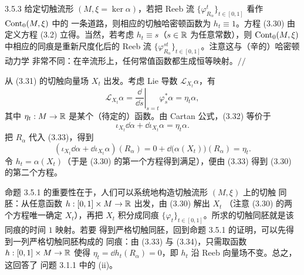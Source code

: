 \begin{wexam}{3.5.3}
给定切触流形 $(M,\xi=\ker\alpha)$，若把 Reeb 流
$\{\varphi^t_{R_\alpha}\}_{t\in[0,1]}$ 看作 $\operatorname{Cont}_0(M,\xi)$ 中的
一条道路，则相应的切触哈密顿函数为 $h_t\equiv1$。方程 (3.30) 由定义方程
(3.2) 立得。当然，若考虑 $h_t\equiv s$（$s\in\mathbb{R}$ 为任意常数），则
$\operatorname{Cont}_0(M,\xi)$ 中相应的同痕是重新尺度化后的 Reeb 流
$\{\varphi^{st}_{R_\alpha}\}_{t\in[0,1]}$。注意这与（辛的）哈密顿动力学
非常不同：在辛流形上，任何常值函数都生成恒等映射。\hfill$//$
\end{wexam}

\begin{wproof}[命题 3.5.1 的证明]
从 (3.31) 的切触向量场 $X_t$ 出发。考虑 Lie 导数
$\mathcal{L}_{X_t}\alpha$，有
\begin{equation}\tag{3.32}
  \mathcal{L}_{X_t}\alpha
  =\left.\frac{\dd}{\dd s}\right|_{s=t}\varphi_s^*\alpha=\eta_t\alpha,
\end{equation}
其中 $\eta_t:M\to\mathbb{R}$ 是某个（待定的）函数。由 Cartan 公式，(3.32) 等价于
\begin{equation}\tag{3.33}
  \iota_{X_t}\dd\alpha+\dd\iota_{X_t}\alpha=\eta_t\alpha .
\end{equation}
把 $R_\alpha$ 代入 (3.33)，得到
\begin{equation}\tag{3.34}
  (\iota_{X_t}\dd\alpha+\dd\iota_{X_t}\alpha)(R_\alpha)
  =0+\dd\bigl(\alpha(X_t)\bigr)(R_\alpha)=\eta_t .
\end{equation}
令 $h_t=\alpha(X_t)$（于是 (3.30) 的第一个方程得到满足），便由 (3.33)
得到 (3.30) 的第二个方程。
\end{wproof}


命题 3.5.1 的重要性在于，人们可以系统地构造切触流形 $(M,\xi)$ 上的切触
同胚：从任意函数 $h:[0,1]\times M\to\mathbb{R}$ 出发，由 (3.30) 解出 $X_t$
（注意 (3.30) 的两个方程唯一确定 $X_t$），再把 $X_t$ 积分成同痕
$\{\varphi_t\}_{t\in[0,1]}$。所求的切触同胚就是该同痕的时间 $1$ 映射。若要
得到严格切触同胚，回到命题 3.5.1 的证明，可以先得到一列严格切触同胚构成的
同痕：由 (3.33) 与 (3.34)，只需取函数 $h:[0,1]\times M\to\mathbb{R}$ 使得
$\eta_t=\dd h_t(R_\alpha)=0$，即 $h_t$ 沿 Reeb 向量场不变。总之，这回答了
问题 3.1.1 中的 (ii)。


